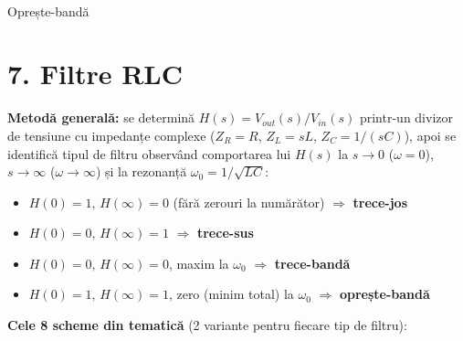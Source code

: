\documentclass[10pt,a4paper]{article}
\begin{document}
\begin{center}
\begin{minipage}{0.24\linewidth}
\end{minipage}\hfill
\begin{minipage}{0.24\linewidth}\centering
{}\\ \scriptsize Oprește-bandă
\end{minipage}
\end{center}

\section*{7. Filtre RLC}
\textbf{Metodă generală:} se determină $H(s)=V_{out}(s)/V_{in}(s)$ printr-un divizor de tensiune cu impedanțe complexe ($Z_R=R$, $Z_L=sL$, $Z_C=1/(sC)$), apoi se identifică tipul de filtru observând comportarea lui $H(s)$ la $s\to0$ ($\omega=0$), $s\to\infty$ ($\omega\to\infty$) și la rezonanță $\omega_0=1/\sqrt{LC}$:
\begin{itemize}
\item $H(0)=1,\,H(\infty)=0$ (fără zerouri la numărător) $\Rightarrow$ \textbf{trece-jos}
\item $H(0)=0,\,H(\infty)=1$ $\Rightarrow$ \textbf{trece-sus}
\item $H(0)=0,\,H(\infty)=0$, maxim la $\omega_0$ $\Rightarrow$ \textbf{trece-bandă}
\item $H(0)=1,\,H(\infty)=1$, zero (minim total) la $\omega_0$ $\Rightarrow$ \textbf{oprește-bandă}
\end{itemize}

\textbf{Cele 8 scheme din tematică} (2 variante pentru fiecare tip de filtru):
\end{document}
